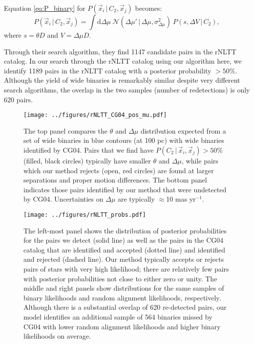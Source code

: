 \documentclass[usenatbib]{mnras}
\newcommand{\given}{\,|\,}
\newcommand{\dd}{\mathrm{d}}
\begin{document}
Equation \ref{eq:P_binary} for $P(\vec{x}_i \given C_2, \vec{x}_j)$ becomes:
\begin{equation}
P(\vec{x}_i \given C_2, \vec{x}_j) = \int \dd \Delta \mu\ 
\mathcal{N}( \Delta \mu' \given \Delta \mu, \sigma^2_{\Delta \mu} )\
P(s, \Delta V \given C_2),
\label{eq:P_binary_rNLTT}
\end{equation}
where $s = \theta D$ and $V = \Delta \mu D$. 


Through their search algorithm, they find 1147 candidate pairs in the rNLTT catalog. In our search through the rNLTT catalog using our algorithm here, we identify 1189 pairs in the rNLTT catalog with a posterior probability $>50$\%. Although the yield of wide binaries is remarkably similar despite very different search algorithms, the overlap in the two samples (number of redetections) is only 620 pairs. 



\begin{figure}
\begin{center}
\texttt{[image: ../figures/rNLTT\_CG04\_pos\_mu.pdf]}
\caption{ The top panel compares the $\theta$ and $\Delta \mu$ distribution expected from a set of wide binaries in blue contours (at 100 pc) with wide binaries identified by CG04. Pairs that we find have $P(C_2 \given \vec{x}_i, \vec{x}_j) > 50\%$ (filled, black circles) typically have smaller $\theta$ and $\Delta \mu$, while pairs which our method rejects (open, red circles) are found at larger separations and proper motion differences. The bottom panel indicates those pairs identified by our method that were undetected by CG04. Uncertainties on $\Delta \mu$ are typically $\approx$10 mas yr$^{-1}$. }
\label{fig:rNLTT_theta_mu}
\end{center}
\end{figure}



\begin{figure*}
\begin{center}
\texttt{[image: ../figures/rNLTT\_probs.pdf]}
\caption{ The left-most panel shows the distribution of posterior probabilities for the pairs we detect (solid line) as well as the pairs in the CG04 catalog that are identified and accepted (dotted line) and identified and rejected (dashed line). Our method typically accepts or rejects pairs of stars with very high likelihood; there are relatively few pairs with posterior probabilities not close to either zero or unity. The middle and right panels show distributions for the same samples of binary likelihoods and random alignment likelihoods, respectively. Although there is a substantial overlap of 620 re-detected pairs, our model identifies an additional sample of 564 binaries missed by CG04 with lower random alignment likelihoods and higher binary likelihoods on average. }
\label{fig:NLTT_probs}
\end{center}
\end{figure*}
\end{document}
